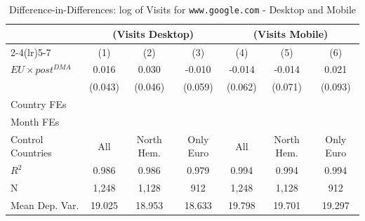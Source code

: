 \documentclass[11pt]{article}
\begin{document}
	\begin{table}
		\centering
		\def\sym#1{\ifmmode^{#1}\else\(^{#1}\)\fi}
		\caption{\label{tab:did_desktop_mobile_google} Difference-in-Differences: log of Visits for \texttt{www.google.com} - Desktop and Mobile}
		\begin{threeparttable}
			\begin{tabular}{lcccccc}
				\hline \noalign{\smallskip} 
				& \multicolumn{3}{c}{(Visits Desktop)} & \multicolumn{3}{c}{(Visits Mobile)}  \\ \cmidrule(lr){2-4}\cmidrule(lr){5-7}
			
			&         (1)   &         (2)   &         (3)   &         (4)   &         (5)   &         (6)   \\
			\midrule
			$ EU \times post^{DMA} $ &       0.016   &       0.030   &      -0.010   &      -0.014   &      -0.014   &       0.021   \\
			&     (0.043)   &     (0.046)   &     (0.059)   &     (0.062)   &     (0.071)   &     (0.093)   \\
			
			Country FEs         &  \checkmark   &  \checkmark   &  \checkmark   &  \checkmark   &  \checkmark   &  \checkmark   \\
			Month FEs           &  \checkmark   &  \checkmark   &  \checkmark   &  \checkmark   &  \checkmark   &  \checkmark   \\
			Control Countries   &         All   &  North Hem.   &   Only Euro   &         All   &  North Hem.   &   Only Euro   \\
			$ R ^2 $            &       0.986   &       0.986   &       0.979   &       0.994   &       0.994   &       0.994   \\
			N                   &       1,248   &       1,128   &         912   &       1,248   &       1,128   &         912   \\
			Mean Dep. Var.      &      19.025   &      18.953   &      18.633   &      19.798   &      19.701   &      19.297   \\
			\midrule
			
			\end{tabular}
			

\end{threeparttable}
\end{table}
\end{document}
